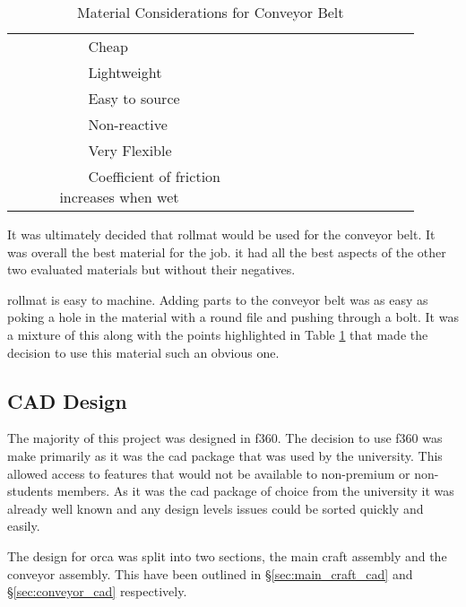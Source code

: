 \documentclass [11pt]{article}
\newcommand{\tabitem}{~~\llap{\textbullet}~~}
\begin{document}
\begin{table}[H]
\begin{tabular}{|p{0.1\linewidth}|p{0.4\linewidth}|p{0.4\linewidth}|}
\cellcolor{gray!20}  & \cellcolor{gray!20} \tabitem Cheap & \cellcolor{gray!20} \\
\cellcolor{gray!20}  & \cellcolor{gray!20} \tabitem Lightweight & \cellcolor{gray!20} \\
\cellcolor{gray!20}  & \cellcolor{gray!20} \tabitem Easy to source & \cellcolor{gray!20} \\
\cellcolor{gray!20}  & \cellcolor{gray!20} \tabitem Non-reactive & \cellcolor{gray!20} \\
\cellcolor{gray!20}  & \cellcolor{gray!20} \tabitem Very Flexible & \cellcolor{gray!20} \\
\cellcolor{gray!20}  & \cellcolor{gray!20} \tabitem Coefficient of friction increases when wet & \cellcolor{gray!20} \\
\hline
\end{tabular}
\caption{Material Considerations for Conveyor Belt}
\label{table:conveyor_materials}
\end{table} 

It was ultimately decided that \gls{rollmat} would be used for the conveyor belt. It was overall the best material for the job. it had all the best aspects of the other two evaluated materials but without their negatives. 

\Gls{rollmat} is easy to machine. Adding parts to the conveyor belt was as easy as poking a hole in the material with a round file and pushing through a bolt. It was a mixture of this along with the points highlighted in Table \ref{table:conveyor_materials} that made the decision to use this material such an obvious one. 


\subsection{CAD Design}

The majority of this project was designed in \gls{f360}. The decision to use \gls{f360} was  make primarily as it was the \gls{cad} package that was used by the university. This allowed access to features that would not be available to non-premium or non-students members. As it was the \gls{cad} package of choice from the university it was already well known and any design levels issues could be sorted quickly and easily. 

The design for \gls{orca} was split into two sections, the main craft assembly and the conveyor assembly. This have been outlined in §\ref{sec:main_craft_cad} and §\ref{sec:conveyor_cad} respectively.
\end{document}
